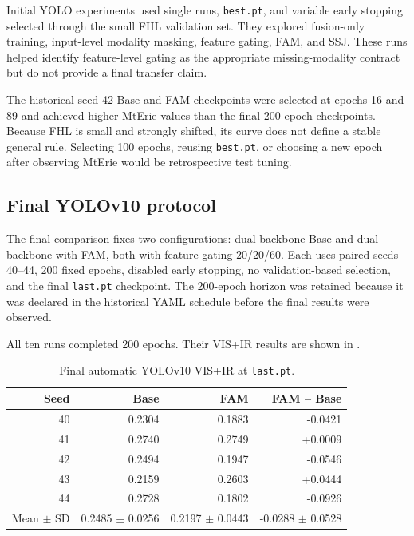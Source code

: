 Initial YOLO experiments used single runs, \texttt{best.pt}, and variable early
stopping selected through the small FHL validation set. They explored
fusion-only training, input-level modality masking, feature gating, FAM, and
SSJ. These runs helped identify feature-level gating as the appropriate
missing-modality contract but do not provide a final transfer claim.

The historical seed-42 Base and FAM checkpoints were selected at epochs 16
and 89 and achieved higher MtErie values than the final 200-epoch checkpoints.
Because FHL is small and strongly shifted, its curve does not define a stable
general rule. Selecting 100 epochs, reusing \texttt{best.pt}, or choosing a new
epoch after observing MtErie would be retrospective test tuning.

\subsection{Final YOLOv10 protocol}

The final comparison fixes two configurations: dual-backbone Base and
dual-backbone with FAM, both with feature gating 20/20/60. Each uses paired
seeds 40--44, 200 fixed epochs, disabled early stopping, no validation-based selection,
and the final \texttt{last.pt} checkpoint. The 200-epoch horizon was retained
because it was declared in the historical YAML schedule before the final results were observed.

All ten runs completed 200 epochs. Their VIS+IR results are shown in .

\begin{table}[htbp]
  \centering
  \caption{Final automatic YOLOv10 VIS+IR \mapfifty{} at \texttt{last.pt}.}
  \label{tab:yolo-raw}
  \begin{tabular}{rrrr}
    \toprule
    Seed & Base & FAM & FAM -- Base \\
    \midrule
    40 & 0.2304 & 0.1883 & -0.0421 \\
    41 & 0.2740 & 0.2749 & +0.0009 \\
    42 & 0.2494 & 0.1947 & -0.0546 \\
    43 & 0.2159 & 0.2603 & +0.0444 \\
    44 & 0.2728 & 0.1802 & -0.0926 \\
    \midrule
    Mean \(\pm\) SD & 0.2485 \(\pm\) 0.0256 & 0.2197 \(\pm\) 0.0443 & -0.0288 \(\pm\) 0.0528 \\
    \bottomrule
  \end{tabular}
\end{table}

